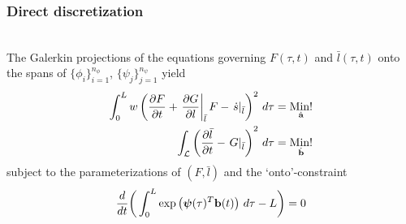 \documentclass[10pt,xcolor=dvipsnames]{beamer}
\renewcommand{\cite}{\parencite}
\begin{document}

\begin{frame}[t]

  \frametitle{Direct discretization}

  \justifying{}\\
  The Galerkin projections of the equations governing $F(\tau, t)$ and $\bar{l}(\tau, t)$ onto the spans of $\{\phi_i\}_{i = 1}^{n_\phi}$, $\{\psi_j\}_{j = 1}^{n_\psi}$ yield \cite{Miller1981}
  \begin{align*}
    \int_{0}^{L} w \left(\frac{\partial F}{\partial t}
    + \left.\frac{\partial G}{\partial l}\right|_{\bar{l}} F - \left.\dot{s}\right|_{\bar{l}} \right)^2 \, d\tau
    &= \underset{\dot{{\mathbf a}}}{\text{Min!}} \\
    \int_{{\mathcal L}} \left(\frac{\partial\bar{l}}{\partial t} - \left.G\right|_{\bar{l}}\right)^2 \, d\tau
    &= \underset{\dot{{\mathbf b}}}{\text{Min!}}
  \end{align*}
  subject to the parameterizations of $(F, \bar{l})$ and the `onto'-constraint
  \begin{equation*}
    \frac{d}{dt} \bigg(\int_{0}^{L} \exp\left({\boldsymbol \psi}(\tau)^T{\mathbf b}(t)\right) \, d\tau - L\bigg) = 0
  \end{equation*}
  \begin{center}
  \resizebox{0.99\columnwidth}{!}{}
  \end{center}

\end{frame}

\end{document}

